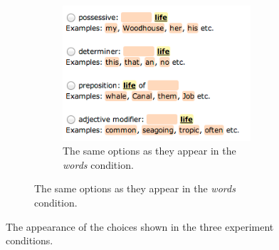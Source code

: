 \begin{figure}[th]
\begin{subfigure}{0.7\columnwidth}
	    \begin{subfigure}{0.7\columnwidth}
	    	\centering
	    	\includegraphics[width=0.9\columnwidth]{fig/words-choices}
	        \caption {The same options as they appear in the \emph{words} condition. \label{fig:words-choices}}
	    \end{subfigure}
	\end{subfigure}
\caption{\label{fig:choices} The appearance of the choices shown in the three experiment conditions.}
\end{figure}




